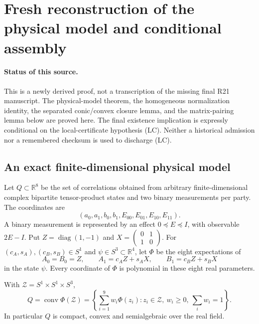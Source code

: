 \section{Fresh reconstruction of the physical model and conditional assembly}
\label{sec:fresh-r21-conditional-assembly}

\paragraph{Status of this source.}
This is a newly derived proof, not a transcription of the missing final
R21 manuscript. The physical-model theorem, the homogeneous normalization
identity, the separated conic/convex closure lemma, and the matrix-pairing
lemma below are proved here. The final existence implication is expressly
conditional on the local-certificate hypothesis (LC). Neither a historical
admission nor a remembered checksum is used to discharge (LC).

\subsection{An exact finite-dimensional physical model}

Let $Q\subset\mathbb R^8$ be the set of correlations obtained from arbitrary
finite-dimensional complex bipartite tensor-product states and two binary
measurements per party. The coordinates are
\[
 (a_0,a_1,b_0,b_1,E_{00},E_{01},E_{10},E_{11}).
 \tag{RFA1}
\]
A binary measurement is represented by an effect $0\preceq E\preceq I$,
with observable $2E-I$. Put
$Z=\operatorname{diag}(1,-1)$ and
$X=\left(\begin{smallmatrix}0&1\\1&0\end{smallmatrix}\right)$.
For $(c_A,s_A),(c_B,s_B)\in S^1$ and $\psi\in S^3\subset\mathbb R^4$,
let $\Phi$ be the eight expectations of
\[
 A_0=B_0=Z,\qquad A_1=c_AZ+s_AX,\qquad B_1=c_BZ+s_BX
 \tag{RFA2}
\]
in the state $\psi$. Every coordinate of $\Phi$ is polynomial in these
eight real parameters.

\begin{theorem}
With $\mathcal Z=S^1\times S^1\times S^3$,
\[
 Q=\operatorname{conv}\Phi(\mathcal Z)
   =\left\{\sum_{i=1}^{9}w_i\Phi(z_i):
       z_i\in\mathcal Z,\ w_i\geq0,\ \sum_iw_i=1\right\}.
 \tag{RFA3}
\]
In particular $Q$ is compact, convex and semialgebraic over the real field.
\end{theorem}

